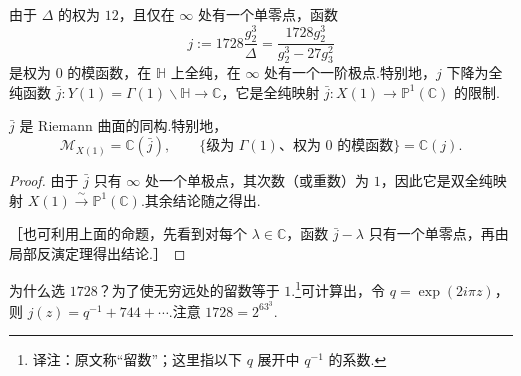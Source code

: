 \begin{example*}[{模不变量 $j$}]
由于 $\Delta$ 的权为 $12$，且仅在 $\infty$ 处有一个单零点，函数
\[
j:=1728\frac{g_2^3}{\Delta}=\frac{1728g_2^3}{g_2^3-27g_3^2}
\]
是权为 $0$ 的模函数，在 $\mathbb H$ 上全纯，在 $\infty$ 处有一个一阶极点.特别地，$j$ 下降为全纯函数 $\bar j:Y(1)=\Gamma(1)\backslash\mathbb H\longrightarrow\mathbb C$，它是全纯映射 $\bar j:X(1)\longrightarrow\mathbb P^1(\mathbb C)$ 的限制.
\end{example*}
\begin{proposition*}
$\bar j$ 是 Riemann 曲面的同构.特别地，
\[
\mathcal M_{X(1)}=\mathbb C(\bar j),\qquad
\{\text{级为 }\Gamma(1)\text{、权为 }0\text{ 的模函数}\}=\mathbb C(j).
\]
\end{proposition*}
\begin{proof}
由于 $\bar j$ 只有 $\infty$ 处一个单极点，其次数（或重数）为 $1$，因此它是双全纯映射 $X(1)\xrightarrow{\sim}\mathbb P^1(\mathbb C)$.其余结论随之得出.

［也可利用上面的命题，先看到对每个 $\lambda\in\mathbb C$，函数 $\bar j-\lambda$ 只有一个单零点，再由局部反演定理得出结论.］
\end{proof}
为什么选 $1728$？为了使无穷远处的留数等于 $1$.\footnote{译注：原文称``留数''；这里指以下 $q$ 展开中 $q^{-1}$ 的系数.}可计算出，令 $q=\exp(2i\pi z)$，则 $j(z)=q^{-1}+744+\cdots$.注意 $1728=2^63^3$.


